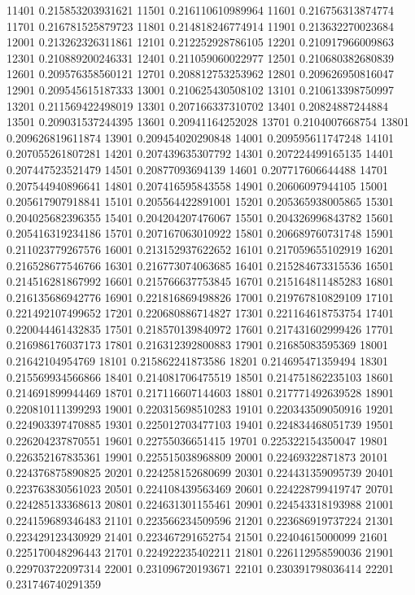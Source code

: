 {11401 0.215853203931621
11501 0.216110610989964
11601 0.216756313874774
11701 0.216781525879723
11801 0.214818246774914
11901 0.213632270023684
12001 0.213262326311861
12101 0.212252928786105
12201 0.210917966009863
12301 0.210889200246331
12401 0.211059060022977
12501 0.210680382680839
12601 0.209576358560121
12701 0.208812753253962
12801 0.209626950816047
12901 0.209545615187333
13001 0.210625430508102
13101 0.210613398750997
13201 0.211569422498019
13301 0.207166337310702
13401 0.20824887244884
13501 0.209031537244395
13601 0.20941164252028
13701 0.2104007668754
13801 0.209626819611874
13901 0.209454020290848
14001 0.209595611747248
14101 0.207055261807281
14201 0.207439635307792
14301 0.207224499165135
14401 0.207447523521479
14501 0.20877093694139
14601 0.207717606644488
14701 0.207544940896641
14801 0.207416595843558
14901 0.20606097944105
15001 0.205617907918841
15101 0.205564422891001
15201 0.205365938005865
15301 0.204025682396355
15401 0.204204207476067
15501 0.204326996843782
15601 0.205416319234186
15701 0.207167063010922
15801 0.206689760731748
15901 0.211023779267576
16001 0.213152937622652
16101 0.217059655102919
16201 0.216528677546766
16301 0.216773074063685
16401 0.215284673315536
16501 0.214516281867992
16601 0.215766637753845
16701 0.215164811485283
16801 0.216135686942776
16901 0.221816869498826
17001 0.219767810829109
17101 0.221492107499652
17201 0.220680886714827
17301 0.221164618753754
17401 0.220044461432835
17501 0.218570139840972
17601 0.217431602999426
17701 0.216986176037173
17801 0.216312392800883
17901 0.21685083595369
18001 0.21642104954769
18101 0.215862241873586
18201 0.214695471359494
18301 0.215569934566866
18401 0.214081706475519
18501 0.214751862235103
18601 0.214691899944469
18701 0.217116607144603
18801 0.217771492639528
18901 0.220810111399293
19001 0.220315698510283
19101 0.220343509050916
19201 0.224903397470885
19301 0.225012703477103
19401 0.224834468051739
19501 0.226204237870551
19601 0.22755036651415
19701 0.225322154350047
19801 0.226352167835361
19901 0.225515038968809
20001 0.22469322871873
20101 0.224376875890825
20201 0.224258152680699
20301 0.224431359095739
20401 0.223763830561023
20501 0.224108439563469
20601 0.224228799419747
20701 0.224285133368613
20801 0.224631301155461
20901 0.224543318193988
21001 0.224159689346483
21101 0.223566234509596
21201 0.223686919737224
21301 0.223429123430929
21401 0.223467291652754
21501 0.22404615000099
21601 0.225170048296443
21701 0.224922235402211
21801 0.226112958590036
21901 0.229703722097314
22001 0.231096720193671
22101 0.230391798036414
22201 0.231746740291359
}
